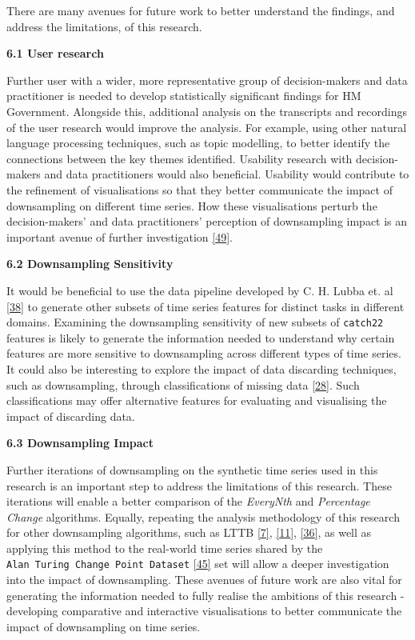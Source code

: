 \documentclass{article}
\begin{document}
There are many avenues for future work to better understand the
findings, and address the limitations, of this research.

\textbf{6.1 User research}

Further user with a wider, more representative group of decision-makers
and data practitioner is needed to develop statistically significant
findings for HM Government. Alongside this, additional analysis on the
transcripts and recordings of the user research would improve the
analysis. For example, using other natural language processing
techniques, such as topic modelling, to better identify the connections
between the key themes identified. Usability research with
decision-makers and data practitioners would also beneficial. Usability
would contribute to the refinement of visualisations so that they better
communicate the impact of downsampling on different time series. How
these visualisations perturb the decision-makers' and data
practitioners' perception of downsampling impact is an important avenue
of further investigation
\protect\hyperlink{ref-graphsampling}{{[}49{]}}.

\textbf{6.2 Downsampling Sensitivity}

It would be beneficial to use the data pipeline developed by C. H. Lubba
et. al \protect\hyperlink{ref-catch22}{{[}38{]}} to generate other
subsets of time series features for distinct tasks in different domains.
Examining the downsampling sensitivity of new subsets of
\texttt{catch22} features is likely to generate the information needed
to understand why certain features are more sensitive to downsampling
across different types of time series. It could also be interesting to
explore the impact of data discarding techniques, such as downsampling,
through classifications of missing data
\protect\hyperlink{ref-missingdata}{{[}28{]}}. Such classifications may
offer alternative features for evaluating and visualising the impact of
discarding data.

\textbf{6.3 Downsampling Impact}

Further iterations of downsampling on the synthetic time series used in
this research is an important step to address the limitations of this
research. These iterations will enable a better comparison of the
\emph{EveryNth} and \emph{Percentage Change} algorithms. Equally,
repeating the analysis methodology of this research for other
downsampling algorithms, such as LTTB
\protect\hyperlink{ref-MinMaxLTTB}{{[}7{]}},
\protect\hyperlink{ref-Sveinn}{{[}11{]}},
\protect\hyperlink{ref-MinMaxOrdered}{{[}36{]}}, as well as applying
this method to the real-world time series shared by the
\texttt{Alan\ Turing\ Change\ Point\ Dataset}
\protect\hyperlink{ref-ATIChangePoint}{{[}45{]}} set will allow a deeper
investigation into the impact of downsampling. These avenues of future
work are also vital for generating the information needed to fully
realise the ambitions of this research - developing comparative and
interactive visualisations to better communicate the impact of
downsampling on time series.
\end{document}
